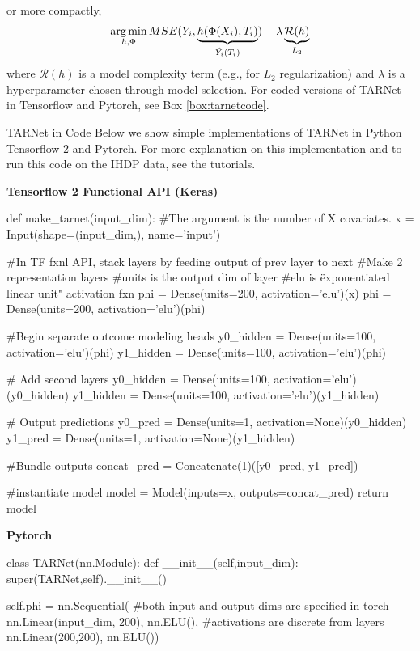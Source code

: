  or more compactly,
\label{eq:tarnetloss}
\begin{equation}
\operatorname*{arg\,min}_{h,\Phi} MSE(Y_i,\underbrace{h(\Phi(X_i),T_i)}_{\hat{Y_i}(T_i)}) + \lambda\underbrace{\mathcal{R}(h)}_{L_2} 
\end{equation}
where $\mathcal{R}(h)$ is a model complexity term (e.g., for $L_2$ regularization) and $\lambda$ is a hyperparameter chosen through model selection. For coded versions of TARNet in Tensorflow and Pytorch, see Box \ref{box:tarnetcode}.  

\begin{TCBBox}[label=box:tarnetcode]{TARNet in Code}
Below we show simple implementations of TARNet in Python Tensorflow 2 and Pytorch. For more explanation on this implementation and to run this code on the IHDP data, see the tutorials.

\textbf{Tensorflow 2 Functional API (Keras)}
\begin{python}
def make_tarnet(input_dim):
    #The argument is the number of X covariates.
    x = Input(shape=(input_dim,), name='input')
    
    #In TF fxnl API, stack layers by feeding output of prev layer to next
    #Make 2 representation layers
    #units is the output dim of layer
    #elu is \"exponentiated linear unit" activation fxn
    phi = Dense(units=200, activation='elu')(x)
    phi = Dense(units=200, activation='elu')(phi)

    #Begin separate outcome modeling heads
    y0_hidden = Dense(units=100, activation='elu')(phi)
    y1_hidden = Dense(units=100, activation='elu')(phi)

    # Add second layers
    y0_hidden = Dense(units=100, activation='elu')(y0_hidden)
    y1_hidden = Dense(units=100, activation='elu')(y1_hidden)

    # Output predictions
    y0_pred = Dense(units=1, activation=None)(y0_hidden)
    y1_pred = Dense(units=1, activation=None)(y1_hidden)
    
    #Bundle outputs
    concat_pred = Concatenate(1)([y0_pred, y1_pred])
    
    #instantiate model
    model = Model(inputs=x, outputs=concat_pred)
    return model
\end{python}
\textbf{Pytorch}
\begin{python}
class TARNet(nn.Module):
    def __init__(self,input_dim):
        super(TARNet,self).__init__()
        
        self.phi = nn.Sequential(
            #both input and output dims are specified in torch
            nn.Linear(input_dim, 200),
            nn.ELU(), #activations are discrete from layers
            nn.Linear(200,200),
            nn.ELU())
            

\end{python}
\end{TCBBox}
